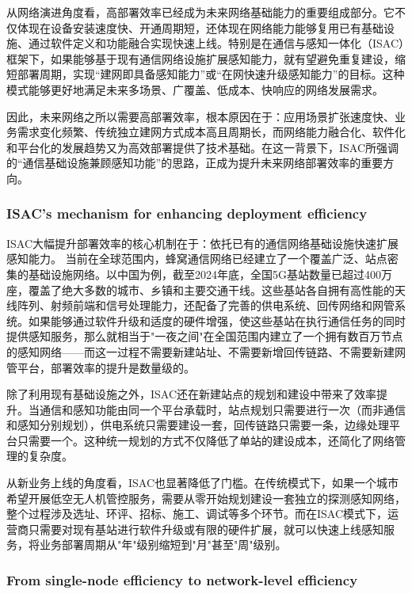 从网络演进角度看，高部署效率已经成为未来网络基础能力的重要组成部分。它不仅体现在设备安装速度快、开通周期短，还体现在网络能力能够复用已有基础设施、通过软件定义和功能融合实现快速上线。特别是在通信与感知一体化（ISAC）框架下，如果能够基于现有通信网络设施扩展感知能力，就有望避免重复建设，缩短部署周期，实现“建网即具备感知能力”或“在网快速升级感知能力”的目标。这种模式能够更好地满足未来多场景、广覆盖、低成本、快响应的网络发展需求。

因此，未来网络之所以需要高部署效率，根本原因在于：应用场景扩张速度快、业务需求变化频繁、传统独立建网方式成本高且周期长，而网络能力融合化、软件化和平台化的发展趋势又为高效部署提供了技术基础。在这一背景下，ISAC所强调的“通信基础设施兼顾感知功能”的思路，正成为提升未来网络部署效率的重要方向。

\subsubsection{ISAC's mechanism for enhancing deployment efficiency}
\label{subsubsec:ch1-isac-core value-deployment-mechanism}

ISAC大幅提升部署效率的核心机制在于：依托已有的通信网络基础设施快速扩展感知能力。
当前在全球范围内，蜂窝通信网络已经建立了一个覆盖广泛、站点密集的基础设施网络。以中国为例，截至2024年底，全国5G基站数量已超过400万座，覆盖了绝大多数的城市、乡镇和主要交通干线。这些基站各自拥有高性能的天线阵列、射频前端和信号处理能力，还配备了完善的供电系统、回传网络和网管系统。如果能够通过软件升级和适度的硬件增强，使这些基站在执行通信任务的同时提供感知服务，那么就相当于"一夜之间"在全国范围内建立了一个拥有数百万节点的感知网络——而这一过程不需要新建站址、不需要新增回传链路、不需要新建网管平台，部署效率的提升是数量级的。

除了利用现有基础设施之外，ISAC还在新建站点的规划和建设中带来了效率提升。当通信和感知功能由同一个平台承载时，站点规划只需要进行一次（而非通信和感知分别规划），供电系统只需要建设一套，回传链路只需要一条，边缘处理平台只需要一个。这种统一规划的方式不仅降低了单站的建设成本，还简化了网络管理的复杂度。

从新业务上线的角度看，ISAC也显著降低了门槛。在传统模式下，如果一个城市希望开展低空无人机管控服务，需要从零开始规划建设一套独立的探测感知网络，整个过程涉及选址、环评、招标、施工、调试等多个环节。而在ISAC模式下，运营商只需要对现有基站进行软件升级或有限的硬件扩展，就可以快速上线感知服务，将业务部署周期从"年"级别缩短到"月"甚至"周"级别。

\subsubsection{From single-node efficiency to network-level efficiency}
\label{subsubsec:ch1-isac-core value-deployment-network}


